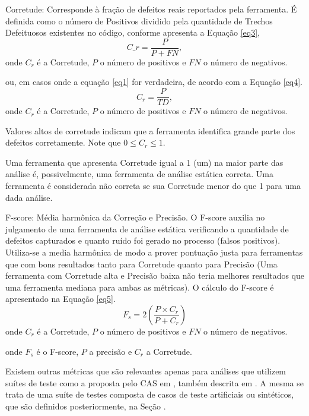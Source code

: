   Corretude: Corresponde à fração de defeitos reais reportados pela ferramenta. É definida como o número de Positivos dividido pela quantidade de Trechos Defeituosos existentes no código, conforme apresenta a Equação \eqref{eq3},
\begin{equation}\label{eq3}
  C\_r = \frac{P}{P + FN},
\end{equation}
  onde $C_r$ é a Corretude, $P$ o número de positivos e $FN$ o número de negativos.

  ou, em casos onde a equação \eqref{eq1} for verdadeira, de acordo com a Equação \eqref{eq4}.
\begin{equation}\label{eq4}
  C_r = \frac{P}{TD},
\end{equation}
  onde $C_r$ é a Corretude, $P$ o número de positivos e $FN$ o número de negativos.

  Valores altos de corretude indicam que a ferramenta identifica grande parte dos defeitos corretamente. Note que $0 \leq C_r \leq 1$.

  Uma ferramenta que apresenta Corretude igual a 1 (um) na maior parte das análise é, possivelmente, uma ferramenta de análise estática correta. Uma ferramenta é considerada não correta se sua Corretude  menor do que 1 para uma dada análise.

  F-score: Média harmônica da Correção e Precisão. O F-score auxilia no julgamento de uma ferramenta de análise estática verificando a quantidade de defeitos capturados e quanto ruído foi gerado no processo (falsos positivos). Utiliza-se a media harmônica de modo a prover pontuação justa para ferramentas que com bons resultados tanto para Corretude quanto para Precisão (Uma ferramenta com Corretude alta e Precisão baixa não teria melhores resultados que uma ferramenta mediana para ambas as métricas). O cálculo do F-score é apresentado na Equação \eqref{eq5}.
\begin{equation}\label{eq5}
  F_s = 2(\frac{P \times C_r}{P + C_r})
\end{equation}
  onde $C_r$ é a Corretude, $P$ o número de positivos e $FN$ o número de negativos.

  onde $F_s$ é o F-score, $P$ a precisão e $C_r$ a Corretude.

  Existem outras métricas que são relevantes apenas para análises que utilizem suítes de teste como a proposta pelo CAS em \cite{nsa}, também descrita em \cite{juliet}. A mesma se trata de uma suíte de testes composta de casos de teste artificiais ou sintéticos, que são definidos posteriormente, na Seção .

